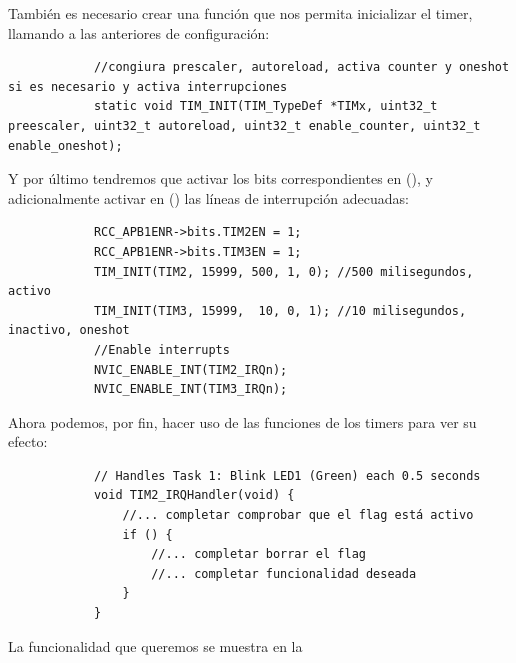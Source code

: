 \documentclass[../main.tex]{subfiles}
\begin{document}
        También es necesario crear una función que nos permita inicializar el timer, llamando a las anteriores de configuración:

        \begin{lstlisting}
            //congiura prescaler, autoreload, activa counter y oneshot si es necesario y activa interrupciones
            static void TIM_INIT(TIM_TypeDef *TIMx, uint32_t preescaler, uint32_t autoreload, uint32_t enable_counter, uint32_t enable_oneshot);
        \end{lstlisting}
        
        Y por último tendremos que activar los bits correspondientes en  (\REFMAN[5.3.13]), y adicionalmente activar en  (\REFMAN[9.1.2]) las líneas de interrupción adecuadas:

        \begin{lstlisting}
            RCC_APB1ENR->bits.TIM2EN = 1;
            RCC_APB1ENR->bits.TIM3EN = 1;
            TIM_INIT(TIM2, 15999, 500, 1, 0); //500 milisegundos, activo
            TIM_INIT(TIM3, 15999,  10, 0, 1); //10 milisegundos, inactivo, oneshot
            //Enable interrupts
            NVIC_ENABLE_INT(TIM2_IRQn);
            NVIC_ENABLE_INT(TIM3_IRQn);
        \end{lstlisting}

        Ahora podemos, por fin, hacer uso de las funciones de los timers para ver su efecto:

        \begin{lstlisting}
            // Handles Task 1: Blink LED1 (Green) each 0.5 seconds
            void TIM2_IRQHandler(void) {
                //... completar comprobar que el flag está activo
                if () {
                    //... completar borrar el flag
                    //... completar funcionalidad deseada
                }
            }
        \end{lstlisting}

        La funcionalidad que queremos se muestra en la 
\end{document}
